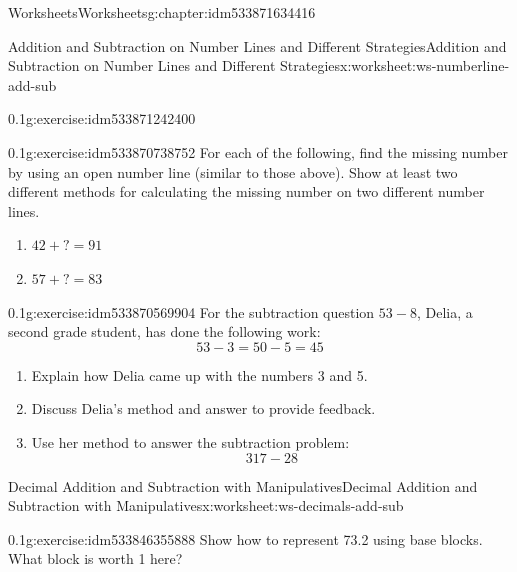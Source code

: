 \documentclass[twoside,11pt,]{book}
\begin{document}
\begin{chapterptx}{Worksheets}{}{Worksheets}{}{}{g:chapter:idm533871634416}
\begin{worksheet-section-numberless}{Addition and Subtraction on Number Lines and Different Strategies}{}{Addition and Subtraction on Number Lines and Different Strategies}{}{}{x:worksheet:ws-numberline-add-sub}
\begin{divisionexercise}{1}{}{0.1}{g:exercise:idm533871242400}
\begin{enumerate}[label=(\alph*)]
\begin{sidebyside}{1}{0.15}{0.15}{0}
\begin{sbspanel}{0.7}
\end{sbspanel}%
\end{sidebyside}%
%
\end{enumerate}
\end{divisionexercise}%
\begin{divisionexercise}{2}{}{0.1}{g:exercise:idm533870738752}%
For each of the following, find the missing number by using an open number line (similar to those above).  Show at least two different methods for calculating the missing number on two different number lines.%
%
\begin{enumerate}[label=(\alph*)]
\item{}\(42+?=91 \)%
\item{}\(57+?=83 \)%
\end{enumerate}
\end{divisionexercise}%
\begin{divisionexercise}{3}{}{0.1}{g:exercise:idm533870569904}%
For the subtraction question \(53-8\), Delia, a second grade student, has done the following work:%
\begin{equation*}
53- 3=50-5=45
\end{equation*}
%
%
\begin{enumerate}[label=(\alph*)]
\item{}Explain how Delia came up with the numbers 3 and 5.%
\item{}Discuss Delia's method and answer to provide feedback.%
\item{}Use her method to answer the subtraction problem:%
\begin{equation*}
317-28
\end{equation*}
%
\end{enumerate}
\end{divisionexercise}%
\end{worksheet-section-numberless}
\restoregeometry
%
%
\typeout{************************************************}
\typeout{************************************************}
%
\begin{worksheet-section-numberless}{Decimal Addition and Subtraction with Manipulatives}{}{Decimal Addition and Subtraction with Manipulatives}{}{}{x:worksheet:ws-decimals-add-sub}
\begin{divisionexercise}{1}{}{0.1}{g:exercise:idm533846355888}%
Show how to represent 73.2 using base blocks.  What block is worth 1 here?%
\end{divisionexercise}%

\end{worksheet-section-numberless}
\end{chapterptx}
\end{document}
